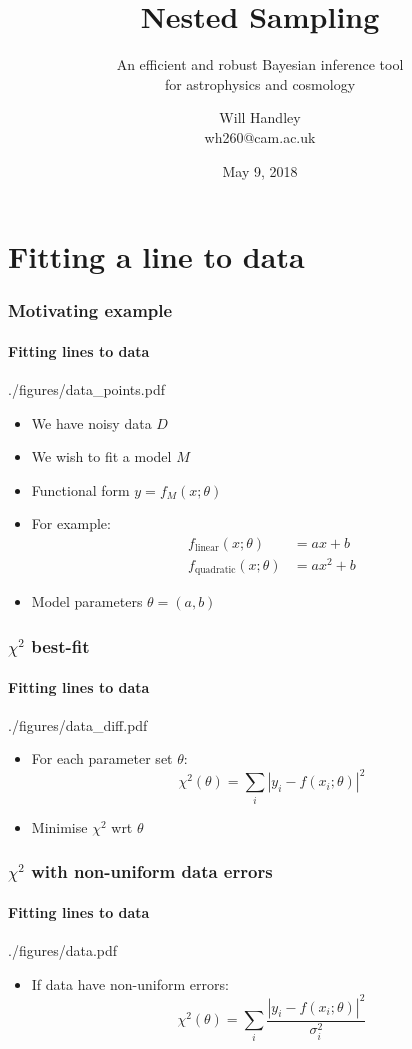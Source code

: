 \documentclass[%
]{beamer}
\title{Nested Sampling}
\subtitle{An efficient and robust Bayesian inference tool\\ for astrophysics and cosmology }
\author[Handley] %
{Will Handley\\ \small{wh260@cam.ac.uk}}
\institute[University of Cambridge] %
{%
Astrophysics Group \\
Cavendish Laboratory \\
University of Cambridge
}
\date{May 9, 2018}
\begin{document}
\begin{frame}
  \titlepage
\end{frame}

\section{Fitting a line to data}
\begin{frame}
    \frametitle{Motivating example}
    \framesubtitle{Fitting lines to data}
    \begin{figright}[0.4]{./figures/data_points.pdf}
        \begin{itemize}
            \item We have noisy data $D$
            \item We wish to fit a model $M$
            \item Functional form $y=f_M(x;\theta)$
            \item For example:
                \begin{align}
                     f_\text{linear}(x;\theta)&=a x + b       \nonumber\\
                     f_\text{quadratic}(x;\theta)&=a x^2 + b  \nonumber
                \end{align}
            \item Model parameters $\theta= (a,b)$
        \end{itemize}
    \end{figright}
\end{frame}

\begin{frame}
    \frametitle{$\chi^2$ best-fit}
    \framesubtitle{Fitting lines to data}
    \begin{figright}[0.4]{./figures/data_diff.pdf}
        \begin{itemize}
            \item For each parameter set $\theta$:
                \[
                    \chi^2(\theta) = \sum_i \left|y_i - f(x_i;\theta)\right|^2
                \]
            \item Minimise $\chi^2$ wrt $\theta$
        \end{itemize}
    \end{figright}
\end{frame}

\begin{frame}
    \frametitle{$\chi^2$ with non-uniform data errors}
    \framesubtitle{Fitting lines to data}
    \begin{figright}[0.4]{./figures/data.pdf}
        \begin{itemize}
            \item If data have non-uniform errors:
                \[
                    \chi^2(\theta) = \sum_i \frac{\left|y_i - f(x_i;\theta)\right|^2}{\sigma_i^2}
                \]
        \end{itemize}
    \end{figright}
\end{frame}
\end{document}
